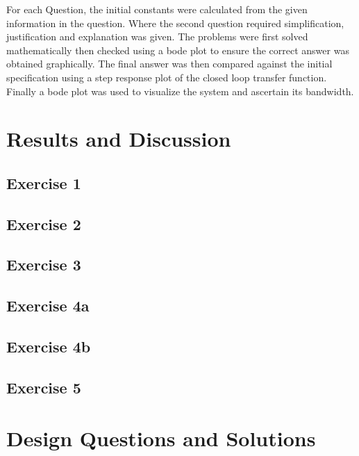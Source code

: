 \documentclass[12pt]{article}
\begin{document}
For each Question, the initial constants were calculated from the given information in the question. Where the second question required simplification, justification and explanation was given. The problems were first solved mathematically then checked using a bode plot to ensure the correct answer was obtained graphically. The final answer was then compared against the initial specification using a step response plot of the closed loop transfer function. Finally a bode plot was used to visualize the system and ascertain its bandwidth.  \\






\pagebreak
\section{Results and Discussion}\label{sec:results}

\subsection{Exercise 1}\label{sec:ex1}

\pagebreak
\subsection{Exercise 2}\label{sec:ex2}

\subsection{Exercise 3}\label{sec:ex3}

\subsection{Exercise 4a}\label{sec:ex4a}

\subsection{Exercise 4b}\label{sec:ex4b}

\subsection{Exercise 5}\label{sec:ex5}

\pagebreak

\section{Design Questions and Solutions}\label{sec:Q4}
\end{document}

